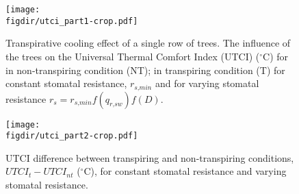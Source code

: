 

	
	\begin{figure}[p]
		\centering
		\texttt{[image: \\figdir/utci\_part1-crop.pdf]}
		\caption{Transpirative cooling effect of a single row of trees. The influence of the trees on the Universal Thermal Comfort Index (UTCI) ($^{\circ}$C) for  in non-transpiring condition (NT); in transpiring condition (T) for  constant stomatal resistance, $r_{\textit{s,min}}$ and  for varying stomatal resistance $r_s=r_{\textit{s,min}} f(q_{\textit{r,sw}})f(D)$.}
		\label{fig:utcifield1}
	\end{figure}
	
	
	\begin{figure}[p]
		\centering
		\texttt{[image: \\figdir/utci\_part2-crop.pdf]}
		\caption{UTCI difference between transpiring and non-transpiring conditions, $\textit{UTCI}_t-\textit{UTCI}_{\textit{nt}}$  ($^{\circ}$C), for  constant stomatal resistance and  varying stomatal resistance.}
		\label{fig:utcifield2}
	\end{figure}

